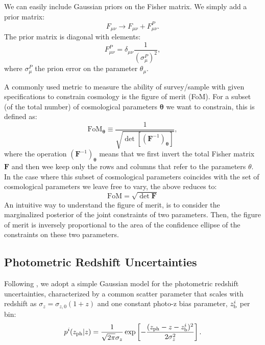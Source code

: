 \documentclass[a4paper,fleqn,usenatbib]{mnras}
\begin{document}
We can easily include Gaussian priors on the Fisher matrix. We simply add a prior matrix:
\begin{equation}
\label{eq: prior_F}
F_{\mu \nu} \to F_{\mu \nu} + F^P_{\mu \nu}.
\end{equation}
The prior matrix is diagonal with elements:
\begin{equation}
F^P_{\mu \nu} = \delta_{\mu \nu}\frac{1}{(\sigma^P_{\mu})^2},
\end{equation}
where $\sigma^P_{\mu}$ the prion error on the parameter $\theta_\mu$.

A commonly used metric to measure the ability of survey/sample with given specifications to constrain cosmology is the figure of merit (FoM). For a subset (of the total number) of cosmological parameters $\mathbf{\theta}$ we want to constrain, this is defined as:
\begin{equation}
\label{eq: FoM_1}
\mbox{FoM}_\mathbf{\theta} \equiv \frac{1}{ \sqrt{\det\left[ (\mathbf{F}^{-1})_\mathbf{\theta}\right]}},
\end{equation}
where the operation $(\mathbf{F}^{-1})_\mathbf{\theta}$ means that we first invert the total Fisher matrix $\mathbf{F}$ and then wee keep only the rows and columns that refer to the parameters $\theta$.
In the case where this subset of cosmological parameters coincides with the set of cosmological parameters we leave free to vary, the above reduces to:
\begin{equation}
\mbox{FoM} = \sqrt{\det{\mathbf{F}}}
\end{equation}
An intuitive way to understand the figure of merit, is to consider the marginalized posterior of the joint constraints of two parameters. Then, the figure of merit is inversely proportional to the area of the confidence ellipse of the constraints on these two parameters.

\subsection{Photometric Redshift Uncertainties }
\label{subsec: Photo-zs}

Following \citealt{Ma2006}, we adopt a  simple Gaussian model for the photometric redshift uncertainties, characterized by a common scatter parameter that scales with redshift  as $\sigma_z = \sigma_{z,0}(1+z)$ and one constant photo-z bias parameter, $z^i_{\mbox{\scriptsize{b}}}$ per bin:
\begin{equation}
p^i(z_{\mbox{\scriptsize{ph}}}|z) = \frac{1}{\sqrt{2\pi} \sigma_z}\exp\left[-\frac{(z_{\mbox{\scriptsize{ph}}}-z-z^i_{\mbox{\scriptsize{b}}})^2}{2\sigma_z^2}\right].
\end{equation}
\end{document}
